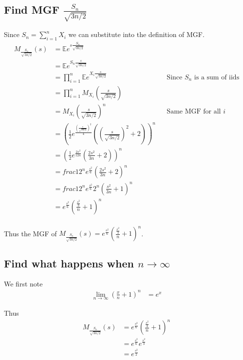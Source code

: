 \documentclass{article}
\newcommand{\expect}{\mathbb{E}}
\begin{document}
\subsection{Find MGF $\frac{S_n}{\sqrt{3n/2}}$}
Since $S_n = \sum_{i=1}^n X_i$ we can substitute into the definition of MGF.
\begin{align*}
    M_{\frac{S_n}{\sqrt{3n/2}}}(s) &= \expect e^{s \frac{S_n}{\sqrt{3n/2}}} \\
    &= \expect e^{S_n \frac{s}{\sqrt{3n/2}}} \\
    &= \prod_{i=1}^n \expect e^{X_i \frac{s}{\sqrt{3n/2}}} && \text{Since $S_n$ is a sum of iids} \\
    &= \prod_{i=1}^n M_{X_i} \left(\frac{s}{\sqrt{3n/2}}\right) \\
    &= M_{X_i} \left(\frac{s}{\sqrt{3n/2}}\right)^n && \text{Same MGF for all $i$} \\
    &= \left(\frac{1}{2} e^{\frac{\left(\frac{s}{\sqrt{3n/2}}\right)^2}{4}}
    \left(\left(\frac{s}{\sqrt{3n/2}}\right)^2+2\right)\right)^n \\
    &= \left(\frac{1}{2} e^{\frac{2s^2}{12n}} \left(\frac{2s^2}{3n}+2\right)\right)^n \\
    &= frac{1}{2^n} e^{\frac{s^2}{6}} (\frac{2s^2}{3n}+2)^n \\
    &= frac{1}{2^n} e^{\frac{s^2}{6}} 2^n (\frac{s^2}{3n}+1)^n \\
    &= e^{\frac{s^2}{6}} (\frac{\frac{s^2}{3}}{n}+1)^n \\
\end{align*}

Thus the MGF of $M_{\frac{S_n}{\sqrt{3n/2}}}(s) = e^{\frac{s^2}{6}} (\frac{\frac{s^2}{3}}{n}+1)^n$.

\subsection{Find what happens when $n \to \infty$}
We first note
\begin{align*}
    \lim_{n \to \infty} (\frac{x}{n} + 1)^n &= e^x
\end{align*}

Thus
\begin{align*}
    M_{\frac{S_n}{\sqrt{3n/2}}}(s)
    &= e^{\frac{s^2}{6}} (\frac{\frac{s^2}{3}}{n}+1)^n \\
    &= e^{\frac{s^2}{6}} e^{\frac{s^2}{3}}\\
    &= e^{\frac{s^2}{2}} \\
\end{align*}
\end{document}
